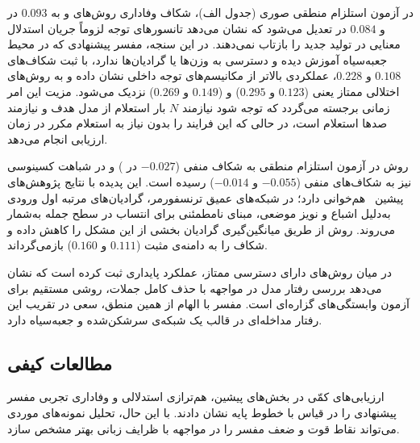 در آزمون استلزام منطقی صوری (جدول الف)، شکاف وفاداری روش‌های  و  به $0.093$ در  و $0.084$ در  تعدیل می‌شود که نشان می‌دهد تانسورهای توجه لزوماً جریان استدلال معنایی در تولید جدید را بازتاب نمی‌دهند. در این سنجه، مفسر پیشنهادی  که در محیط جعبه‌سیاه آموزش دیده و دسترسی به وزن‌ها یا گرادیان‌ها ندارد، با ثبت شکاف‌های $0.108$ و $0.228$، عملکردی بالاتر از مکانیسم‌های توجه داخلی نشان داده و به روش‌های اختلالی ممتاز یعنی  ($0.123$ و $0.295$) و  ($0.149$ و $0.269$) نزدیک می‌شود. مزیت این امر زمانی برجسته می‌گردد که توجه شود  نیازمند $N$ بار استعلام از مدل هدف و  نیازمند صدها استعلام است، در حالی که  این فرایند را بدون نیاز به استعلام مکرر در زمان ارزیابی انجام می‌دهد.

روش  در آزمون استلزام منطقی به شکاف منفی ($-0.027$ در ) و در شباهت کسینوسی نیز به شکاف‌های منفی ($-0.055$ و $-0.014$) رسیده است. این پدیده با نتایج پژوهش‌های پیشین~\cite{kindermans2019reliability, atanasova2023faithfulness} هم‌خوانی دارد؛ در شبکه‌های عمیق ترنسفورمر، گرادیان‌های مرتبه اول ورودی به‌دلیل اشباع و نویز موضعی، مبنای نامطمئنی برای انتساب در سطح جمله به‌شمار می‌روند. روش  از طریق میانگین‌گیری گرادیان بخشی از این مشکل را کاهش داده و شکاف را به دامنه‌ی مثبت ($0.111$ و $0.160$) بازمی‌گرداند.

در میان روش‌های دارای دسترسی ممتاز،  عملکرد پایداری ثبت کرده است که نشان می‌دهد بررسی رفتار مدل در مواجهه با حذف کامل جملات، روشی مستقیم برای آزمون وابستگی‌های گزاره‌ای است. مفسر  با الهام از همین منطق، سعی در تقریب این رفتار مداخله‌ای در قالب یک شبکه‌ی سرشکن‌شده و جعبه‌سیاه دارد.


\subsection{مطالعات کیفی}\label{sec:5-3-3}

ارزیابی‌های کمّی در بخش‌های پیشین، هم‌ترازی استدلالی و وفاداری تجربی مفسر پیشنهادی را در قیاس با خطوط پایه نشان دادند. با این حال، تحلیل نمونه‌های موردی می‌تواند نقاط قوت و ضعف مفسر  را در مواجهه با ظرایف زبانی بهتر مشخص سازد.


